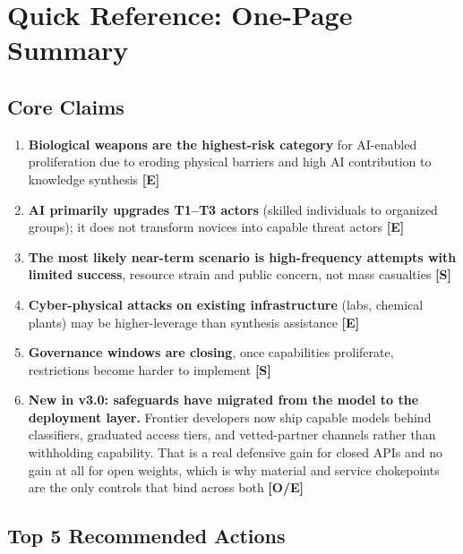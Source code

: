 \documentclass[11pt,letterpaper]{article}
\begin{document}
\newpage
\tableofcontents
\newpage

\section*{Quick Reference: One-Page Summary}

\subsection*{Core Claims}

\begin{enumerate}
  \item \textbf{Biological weapons are the highest-risk category} for AI-enabled proliferation due to eroding physical barriers and high AI contribution to knowledge synthesis \textbf{[E]}
  \item \textbf{AI primarily upgrades T1--T3 actors} (skilled individuals to organized groups); it does not transform novices into capable threat actors \textbf{[E]}
  \item \textbf{The most likely near-term scenario is high-frequency attempts with limited success}, resource strain and public concern, not mass casualties \textbf{[S]}
  \item \textbf{Cyber-physical attacks on existing infrastructure} (labs, chemical plants) may be higher-leverage than synthesis assistance \textbf{[E]}
  \item \textbf{Governance windows are closing}, once capabilities proliferate, restrictions become harder to implement \textbf{[S]}
  \item \textbf{New in v3.0: safeguards have migrated from the model to the deployment layer.} Frontier developers now ship capable models behind classifiers, graduated access tiers, and vetted-partner channels rather than withholding capability. That is a real defensive gain for closed APIs and no gain at all for open weights, which is why material and service chokepoints are the only controls that bind across both \textbf{[O/E]}
\end{enumerate}

\subsection*{Top 5 Recommended Actions}
\end{document}
